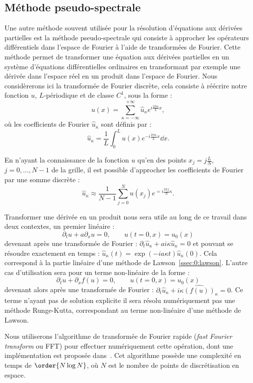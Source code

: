 \subsection{Méthode pseudo-spectrale}

Une autre méthode souvent utilisée pour la résolution d'équations aux dérivées partielles est la méthode pseudo-spectrale qui consiste à approcher les opérateurs différentiels dans l'espace de Fourier à l'aide de transformées de Fourier. Cette méthode permet de transformer une équation aux dérivées partielles en un système d'équations différentielles ordinaires en transformant par exemple une dérivée dans l'espace réel en un produit dans l'espace de Fourier. Nous considèrerons ici la transformée de Fourier discrète, cela consiste à réécrire notre fonction $u$, $L$-périodique et de classe $C^1$, sous la forme :
$$
  u(x) = \sum_{\kappa=-\infty}^{+\infty} \hat{u}_\kappa e^{i\frac{2\pi \kappa}{L}x},
$$
où les coefficients de Fourier $\hat{u}_\kappa$ sont définis par :
$$
  \hat{u}_\kappa = \frac{1}{L}\int_0^L u(x)e^{-i\frac{2\pi \kappa}{L}x}\dd{x}.
$$

En n'ayant la connaissance de la fonction $u$ qu'en des points $x_j = j\frac{L}{N}$, $j=0,\dots,N-1$ de la grille, il est possible d'approcher les coefficients de Fourier par une somme discrète :
$$
  \hat{u}_\kappa \approx \frac{1}{N-1}\sum_{j=0}^N u(x_j) e^{=i\frac{2\pi j}{N}\kappa}.
$$

Transformer une dérivée en un produit nous sera utile au long de ce travail dans deux contextes, un premier linéaire :
$$
  \partial_t u + a\partial_x u = 0,\qquad u(t=0,x)=u_0(x)
$$
devenant après une transformée de Fourier : $\partial_t \hat{u}_\kappa + ai\kappa \hat{u}_\kappa = 0$ et pouvant se résoudre exactement en temps : $\hat{u}_\kappa(t) = \exp(-ia\kappa t)\hat{u}_\kappa(0)$. Cela correspond à la partie linéaire d'une méthode de Lawson~\ref{ssec:0:lawson}. L'autre cas d'utilisation sera pour un terme non-linéaire de la forme :
$$
  \partial_t u + \partial_xf(u) = 0,\qquad u(t=0,x)=u_0(x)
$$
devenant alors après une transformée de Fourier : $\partial_t\hat{u}_\kappa + i\kappa\widehat{\left(f(u)\right)}_\kappa = 0$. Ce terme n'ayant pas de solution explicite il sera résolu numériquement pas une méthode Runge-Kutta, correspondant au terme non-linéaire d'une méthode de Lawson.

Nous utiliserons l'algorithme de transformée de Fourier rapide (\emph{fast Fourier transform} ou FFT) pour effectuer numériquement cette opération, dont une implémentation est proposée dans~\cite{Saramito:2013}. Cet algorithme possède une complexité en temps de $\order{N\log N}$, où $N$ est le nombre de points de discrétisation en espace.
